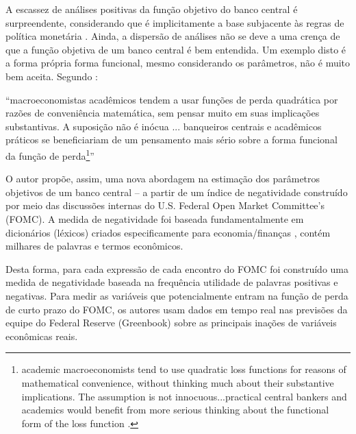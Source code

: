 A escassez de análises positivas da função objetivo do banco central é surpreendente, considerando que é implicitamente a base subjacente às regras de política monetária \cite{shapiro2019taking}. Ainda, a dispersão de análises não se deve a uma crença de que a função objetiva de um banco central é bem entendida. Um exemplo disto é a forma própria forma funcional, mesmo considerando os parâmetros, não é muito bem aceita. Segundo :

\begin{citacao}
``macroeconomistas acadêmicos tendem a usar funções de perda quadrática por razões de conveniência matemática, sem pensar muito em suas implicações substantivas. A suposição não é inócua ... banqueiros centrais e acadêmicos práticos se beneficiariam de um pensamento mais sério sobre a forma funcional da função de perda\footnote{academic macroeconomists tend to use quadratic loss functions for reasons of mathematical convenience, without thinking much about their substantive implications. The assumption is not innocuous...practical central bankers and academics would benefit from more serious thinking about the functional form of the loss function \cite[p.6]{blinder1997distinguished}. }\cite[p.6]{blinder1997distinguished}''
\end{citacao}

O autor propõe, assim, uma nova abordagem na estimação dos parâmetros objetivos de um banco central -- a partir de um índice de negatividade construído por meio das discussões internas do U.S. Federal Open Market Committee's (FOMC). A medida de negatividade foi baseada fundamentalmente em dicionários (léxicos) criados especificamente para economia/finanças , contém milhares de palavras e termos econômicos.

Desta forma, para cada expressão de cada encontro do FOMC foi construído uma medida de negatividade baseada na frequência utilidade de palavras positivas e negativas. Para medir as variáveis que potencialmente entram na função de perda de curto prazo do FOMC, os autores usam dados em tempo real nas previsões da equipe do Federal Reserve (Greenbook) sobre as principais inações de variáveis econômicas reais.

